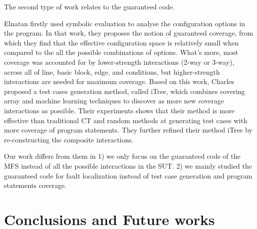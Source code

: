 \documentclass{sig-alternate-05-2015}
\begin{document}
%
%



The second type of work  relates to the guaranteed code.

Elnatan \cite{reisner2010using} firstly used symbolic evaluation to analyse the configuration options in the program. In that work, they proposes the notion of guaranteed coverage, from which they find that the effective configuration space is relatively small when compared to the all the possible combinations of options. What's more, most coverage was accounted for by lower-strength interactions (2-way or 3-way), across all of line, basic block, edge, and conditions, but higher-strength interactions are needed for maximum coverage.  Based on this work, Charles \cite{song2012itree} proposed a test cases generation method, called iTree, which combines covering array and machine learning techniques to discover as more new coverage interactions as possible. Their experiments shows that their method is more effective than traditional CT and random methods at generating test cases with more coverage of program statements. They further refined their method iTree \cite{song2014itree} by re-constructing the composite interactions.

Our work differs from them in 1) we only focus on the guaranteed code of the MFS instead of all the possible interactions in the SUT. 2) we mainly studied the guaranteed code for fault localization instead of test case generation and program statements coverage.

\section{Conclusions and Future works}\label{sec:conclusion}
\end{document}
